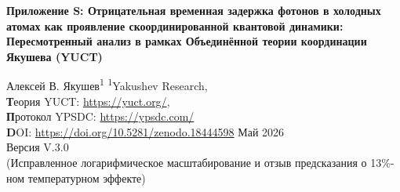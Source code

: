\documentclass[12pt,a4paper]{article}
\begin{document}
	
	\begin{titlepage}
		\centering
		\vspace*{1cm}
		{\Huge\bfseries Приложение S: Отрицательная временная задержка фотонов в холодных атомах как проявление скоординированной квантовой динамики: \\ Пересмотренный анализ в рамках Объединённой теории координации Якушева (YUCT)}
		\vspace{1.5cm}
		
		{\large Алексей В. Якушев\textsuperscript{1}}
		\vspace{0.3cm}
		{\normalsize \textsuperscript{1}Yakushev Research, \\ 
			\textbf Теория YUCT: \url{https://yuct.org/}, \\ 
			\textbf Протокол YPSDC: \url{https://ypsdc.com/}\\
			\textbf DOI: \url{https://doi.org/10.5281/zenodo.18444598}}
		\vspace{1cm}
		{\normalsize Май 2026 \\ \large Версия V.3.0 \\(Исправленное логарифмическое масштабирование и отзыв предсказания о 13\%-ном температурном эффекте)}
		
		\vfill
		

\end{titlepage}
\end{document}
